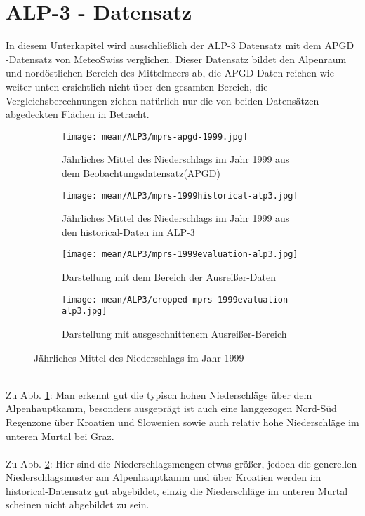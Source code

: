 \section{ALP-3 - Datensatz}
In diesem Unterkapitel wird ausschließlich der ALP-3 Datensatz mit dem APGD -Datensatz von MeteoSwiss \cite{apgd} verglichen. Dieser Datensatz bildet den Alpenraum und nordöstlichen Bereich des Mittelmeers ab, die APGD Daten reichen wie weiter unten ersichtlich nicht über den gesamten Bereich, die Vergleichsberechnungen ziehen natürlich nur die von beiden Datensätzen abgedeckten Flächen in Betracht.\\
\begin{figure}[hbt!]
	\begin{subfigure}{0.49\textwidth}
	\texttt{[image: mean/ALP3/mprs-apgd-1999.jpg]}
	\caption{Jährliches Mittel des Niederschlags im Jahr 1999 aus dem Beobachtungsdatensatz(APGD)}
	\label{fig:mean_apgd_1999}
	\end{subfigure}
	\begin{subfigure}{0.49\textwidth}
		\texttt{[image: mean/ALP3/mprs-1999historical-alp3.jpg]}
		\caption{Jährliches Mittel des Niederschlags im Jahr 1999 aus den historical-Daten im ALP-3}
		\label{fig:mean_hist_alp3_1999}
	\end{subfigure}
	\begin{subfigure}{0.49\textwidth}
		\texttt{[image: mean/ALP3/mprs-1999evaluation-alp3.jpg]}
		\caption{Darstellung mit dem Bereich der Ausreißer-Daten}
		\label{fig:mean_eval_alp3_1999}
	\end{subfigure}
	\begin{subfigure}{0.49\textwidth}
		\texttt{[image: mean/ALP3/cropped-mprs-1999evaluation-alp3.jpg]}
		\caption{Darstellung mit ausgeschnittenem Ausreißer-Bereich}
		\label{fig:cropped_mean_eval_alp3_1999}
	\end{subfigure}
	\caption{Jährliches Mittel des Niederschlags im Jahr 1999}
\end{figure}
\\
Zu Abb. \ref{fig:mean_apgd_1999}: Man erkennt gut die typisch hohen Niederschläge über dem Alpenhauptkamm, besonders ausgeprägt ist auch eine langgezogen Nord-Süd Regenzone über Kroatien und Slowenien sowie auch relativ hohe Niederschläge im unteren Murtal bei Graz.\\
\\
Zu Abb. \ref{fig:mean_hist_alp3_1999}: Hier sind die Niederschlagsmengen etwas größer, jedoch die generellen Niederschlagsmuster am Alpenhauptkamm und über Kroatien werden im historical-Datensatz gut abgebildet, einzig die Niederschläge im unteren Murtal scheinen nicht abgebildet zu sein.\\
